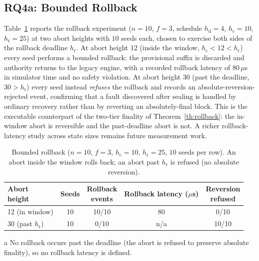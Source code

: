 \documentclass[journal]{IEEEtran}
\theoremstyle{remark}
\begin{document}
\subsection{RQ4a: Bounded Rollback}
Table~\ref{tab:rollback} reports the rollback experiment ($n{=}10$, $f{=}3$,
schedule $h_{\mathrm{d}}{=}4$, $h_{\mathrm{c}}{=}10$, $h_{\mathrm{r}}{=}25$) at two abort heights
with $10$ seeds each, chosen to exercise both sides of the rollback deadline $h_{\mathrm{r}}$. At
abort height $12$ (inside the window, $h_{\mathrm{c}}{<}12{<}h_{\mathrm{r}}$) every seed performs
a bounded rollback: the provisional suffix is discarded and authority returns to the legacy
engine, with a recorded rollback latency of $80\,\mu$s in simulator time and no safety violation.
At abort height $30$ (past the deadline, $30{>}h_{\mathrm{r}}$) every seed instead \emph{refuses}
the rollback and records an absolute-reversion-rejected event, confirming that a fault discovered
after sealing is handled by ordinary recovery rather than by reverting an absolutely-final block.
This is the executable counterpart of the two-tier finality of Theorem~\ref{th:rollback}: the
in-window abort is reversible and the past-deadline abort is not. A richer rollback-latency study
across state sizes remains future measurement work.

\begin{table}[t]
\centering
\begin{threeparttable}
\caption{Bounded rollback
($n{=}10$, $f{=}3$, $h_{\mathrm{c}}{=}10$, $h_{\mathrm{r}}{=}25$, $10$ seeds per row). An abort
inside the window rolls back; an abort past $h_{\mathrm{r}}$ is refused (no absolute reversion).}
\label{tab:rollback}
\setlength{\tabcolsep}{4pt}
\renewcommand{\arraystretch}{1.2}
\footnotesize
\begin{tabular}{lcccc}
\toprule
\makecell{Abort\\height} & Seeds & \makecell{Rollback\\events} & \makecell{Rollback\\latency ($\mu$s)} & \makecell{Reversion\\refused} \\
\midrule
12 (in window)            & 10 & 10/10 & 80           & 0/10  \\
30 (past $h_{\mathrm{r}}$) & 10 & 0/10  & n/a\tnote{a} & 10/10 \\
\bottomrule
\end{tabular}
\begin{tablenotes}\footnotesize
\item[a] No rollback occurs past the deadline (the abort is refused to preserve absolute
finality), so no rollback latency is defined.
\end{tablenotes}
\end{threeparttable}
\end{table}
\end{document}

